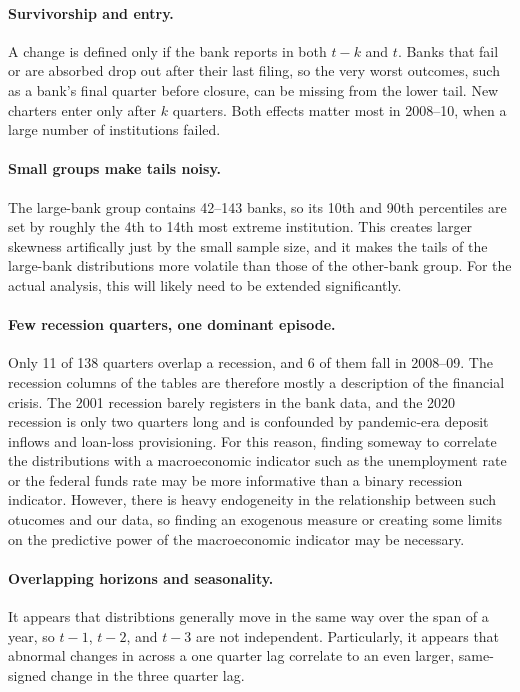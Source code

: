 \documentclass[11pt]{article}
\begin{document}
\paragraph{Survivorship and entry.}
A change is defined only if the bank reports in both $t-k$ and $t$. Banks that fail or are absorbed drop out after their last filing, so the very worst outcomes, such as a bank's final quarter before closure, can be missing from the lower tail. New charters enter only after $k$ quarters. Both effects matter most in 2008--10, when a large number of institutions failed.

\paragraph{Small groups make tails noisy.}
The large-bank group contains 42--143 banks, so its 10th and 90th percentiles are set by roughly the 4th to 14th most extreme institution. This creates larger skewness artifically just by the small sample size, and it makes the tails of the large-bank distributions more volatile than those of the other-bank group. For the actual analysis, this will likely need to be extended significantly.

\paragraph{Few recession quarters, one dominant episode.}
Only 11 of 138 quarters overlap a recession, and 6 of them fall in 2008--09. The recession columns of the tables are therefore mostly a description of the financial crisis. The 2001 recession barely registers in the bank data, and the 2020 recession is only two quarters long and is confounded by pandemic-era deposit inflows and loan-loss provisioning. For this reason, finding someway to correlate the distributions with a macroeconomic indicator such as the unemployment rate or the federal funds rate may be more informative than a binary recession indicator. However, there is heavy endogeneity in the relationship between such otucomes and our data, so finding an exogenous measure or creating some limits on the predictive power of the macroeconomic indicator may be necessary.

\paragraph{Overlapping horizons and seasonality.}
It appears that distribtions generally move in the same way over the span of a year, so $t-1$, $t-2$, and $t-3$ are not independent. Particularly, it appears that abnormal changes in across a one quarter lag correlate to an even larger, same-signed change in the three quarter lag. 
\end{document}
